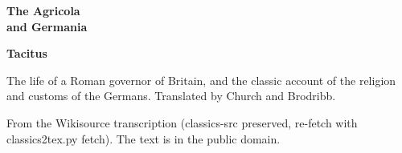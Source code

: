 \documentclass[11pt,letterpaper]{article}
\begin{document}
\color{ink}

\begin{titlepage}
\centering
\vspace*{4em}
{\LARGE\bfseries\color{heading} The Agricola\\[0.3em]and Germania\par}
\vspace{2em}
{\Large\bfseries\color{heading} Tacitus\par}
\vspace{2.5em}
{\itshape\color{subhead}\parbox{0.8\linewidth}{\centering The life of a Roman governor of Britain, and the classic account of the religion and customs of the Germans. Translated by Church and Brodribb.\par}}
\vfill
{\small From the Wikisource transcription (classics-src preserved, re-fetch with classics2tex.py fetch). The text is in the public domain.\par}
\vspace{2em}
\end{titlepage}

\tableofcontents


\end{document}
